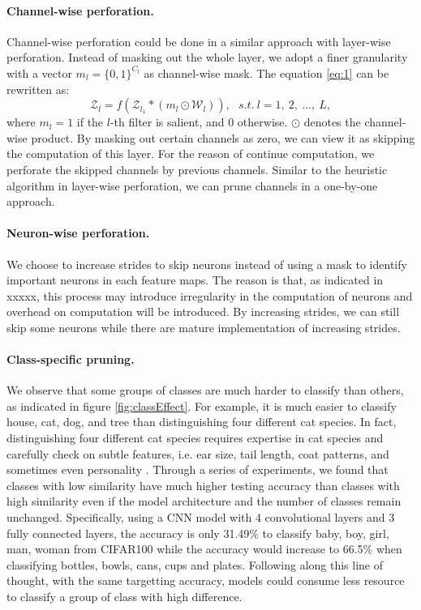 \documentclass[pageno]{jpaper}
\begin{document}
\paragraph{Channel-wise perforation.} Channel-wise perforation could be done in a similar approach with layer-wise perforation. Instead of masking out the whole layer, we adopt a finer granularity with a vector $m_l = \{0,1\}^{C_l}$ as channel-wise mask. The equation \ref{eq:1} can be rewritten as:
\begin{equation} \label{eq: 3}
    \mathcal{Z}_l = f(\mathcal{Z}_{l_1} \ast (m_l \odot \mathcal{W}_l) ), \ \ \  s.t. \: l = 1,\: 2, \: \dots, \: L,
\end{equation}
where $m_l = 1$ if the $l$-th filter is salient, and $0$ otherwise. $\odot$ denotes the channel-wise product. By masking out certain channels as zero, we can view it as skipping the computation of this layer. For the reason of continue computation, we perforate the skipped channels by previous channels. Similar to the heuristic algorithm in layer-wise perforation, we can prune channels in a one-by-one approach.

\paragraph{Neuron-wise perforation.} We choose to increase strides to skip neurons instead of using a mask to identify important neurons in each feature maps. The reason is that, as indicated in xxxxx, this process may introduce irregularity in the computation of neurons and overhead on computation will be introduced. By increasing strides, we can still skip some neurons while there are mature implementation of increasing strides.




\paragraph{Class-specific pruning.} 
We observe that some groups of classes are much harder to classify than others, as indicated in figure \ref{fig:classEffect}. For example, it is much easier to classify house, cat, dog, and tree than distinguishing four different cat species. In fact, distinguishing four different cat species requires expertise in cat species and carefully check on subtle features, i.e. ear size, tail length, coat patterns, and sometimes even personality \cite{cat2018}. Through a series of experiments, we found that classes with low similarity have much higher testing accuracy than classes with high similarity even if the model architecture and the number of classes remain unchanged. Specifically, using a CNN model with 4 convolutional layers and 3 fully connected layers, the accuracy is only 31.49\% to classify baby, boy, girl, man, woman from CIFAR100 while the accuracy would increase to 66.5\% when classifying bottles, bowls, cans, cups and plates. Following along this line of thought, with the same targetting accuracy, models could consume less resource to classify a group of class with high difference. 
\end{document}

